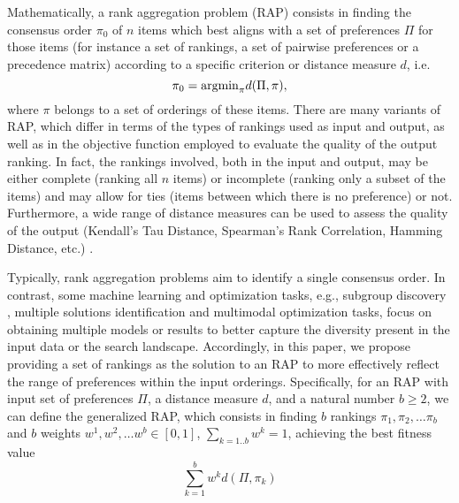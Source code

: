 \documentclass[preprint,12pt]{article}
\theoremstyle{definition}
\theoremstyle{remark}
\theoremstyle{example} %
\begin{document}
Mathematically, a rank aggregation problem (RAP) consists in finding the consensus order $\pi_0$ of $n$ items which best aligns with a set of preferences $\Pi$ for those items (for instance a set of rankings, a set of pairwise preferences or a precedence matrix) according to a specific criterion or distance measure $d$, i.e.
\[
\pi_0={\rm argmin}_{\pi} d(\Pi, \pi),
\]
where $\pi$ belongs to  a set of orderings of these items. There are many variants of RAP, which differ in terms of the types of rankings used as input and output, as well as in the objective function employed to evaluate the quality of the output ranking. In fact, the rankings involved, both in the input and output, may be either complete (ranking all $n$ items) or incomplete (ranking only a subset of the items) and may allow for ties (items between which there is no preference) or not. Furthermore,  a wide range of distance measures can be used to assess the quality of the output (Kendall's Tau Distance, Spearman’s Rank Correlation, Hamming Distance, etc.) \cite{Kumar:2010}. 

Typically, rank aggregation problems aim to identify a single consensus order. In contrast, some machine learning and optimization tasks, e.g., subgroup discovery \cite{SubgroupDiscovery:2011}, multiple solutions identification \cite{Kumar:2020} and multimodal optimization \cite{Yu2010} tasks, focus on obtaining multiple models or results to better capture the diversity present in the input data or the search landscape. Accordingly, in this paper, we propose providing a set of rankings as the solution to  an RAP to more effectively reflect the range of preferences within the input orderings. Specifically, for an RAP with input set of preferences $\Pi$, a distance measure $d$, and a natural number $b\geq 2$, we can define the generalized RAP, which consists in finding $b$ rankings $\pi_1,\pi_2,\dots \pi_b$  and $b$ weights $w^1,w^2,\dots w^b\in [0,1]$, $\sum_{k=1..b} w^k =1$, achieving the best fitness value
\[
\sum_{k=1}^b w^k d(\Pi,\pi_k)
\] 
\end{document}
